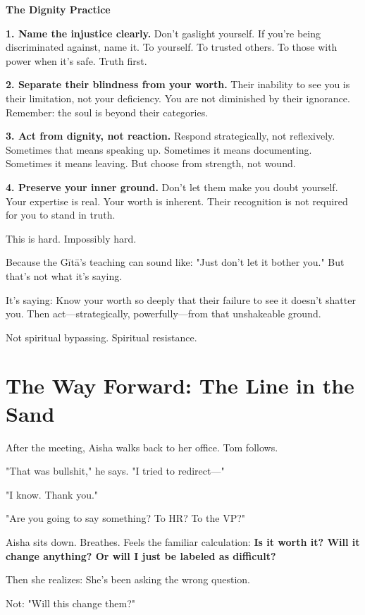 \documentclass[11pt,twoside]{book}
\begin{document}
\begin{practicebox}
\textbf{The Dignity Practice}

\textbf{1. Name the injustice clearly.}
Don't gaslight yourself. If you're being discriminated against, name it. To yourself. To trusted others. To those with power when it's safe. Truth first.

\textbf{2. Separate their blindness from your worth.}
Their inability to see you is their limitation, not your deficiency. You are not diminished by their ignorance. Remember: the soul is beyond their categories.

\textbf{3. Act from dignity, not reaction.}
Respond strategically, not reflexively. Sometimes that means speaking up. Sometimes it means documenting. Sometimes it means leaving. But choose from strength, not wound.

\textbf{4. Preserve your inner ground.}
Don't let them make you doubt yourself. Your expertise is real. Your worth is inherent. Their recognition is not required for you to stand in truth.
\end{practicebox}

This is hard. Impossibly hard.

Because the Gītā's teaching can sound like: "Just don't let it bother you." But that's not what it's saying.

It's saying: Know your worth so deeply that their failure to see it doesn't shatter you. Then act—strategically, powerfully—from that unshakeable ground.

Not spiritual bypassing. Spiritual resistance.

\section*{The Way Forward: The Line in the Sand}

After the meeting, Aisha walks back to her office. Tom follows.

"That was bullshit," he says. "I tried to redirect—"

"I know. Thank you."

"Are you going to say something? To HR? To the VP?"

Aisha sits down. Breathes. Feels the familiar calculation: \textbf{Is it worth it? Will it change anything? Or will I just be labeled as difficult?}

Then she realizes: She's been asking the wrong question.

Not: "Will this change them?"
\end{document}

